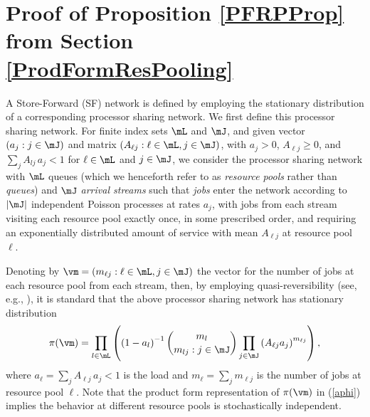 \documentclass{amsart}
\begin{document}
\section{Proof of Proposition \ref{PFRPProp} from Section \ref{ProdFormResPooling}}
A Store-Forward (SF) network is defined by employing the stationary distribution of a corresponding
processor sharing network.
We first define this processor sharing network. For finite index sets $\mL$ and $\mJ$, and given vector 
$(a_j: j\in \mJ)$ and matrix $(A_{\ell j}: \ell \in \mL, j \in \mJ)$, with $a_j >0$, $A_{\ell j} \ge 0$, and $\sum_{j} A_{lj} \, a_j < 1$
for $\ell\in \mL$ and $j\in \mJ$, we consider the processor sharing network with $\mL$ queues (which we henceforth refer to as \emph{resource pools} rather than \emph{queues}) and $\mJ$ \emph{arrival streams} such that \emph{jobs} enter the network according to $|\mJ|$ independent Poisson processes at rates $a_j$, with jobs from each stream visiting
each resource pool exactly once, in some prescribed order, and requiring an
exponentially distributed amount of service with mean $A_{\ell j}$ at resource pool $\ell$.  

Denoting by $\vm = (m_{\ell j}: \ell \in \mL, j \in \mJ)$ the vector for the number of 
jobs at each resource pool from each stream, then, by employing quasi-reversibility (see, e.g., \cite{Ke79}), it is standard that the above processor sharing network has stationary distribution
\begin{equation}
\label{aphi}
\pi(\vm)=
\prod_{l \in \mL}   \left( \left({1-a_l}\right)^{-1} {{m}_l \choose {m}_{lj}: j\in\mJ}\prod_{\substack{j \in\mJ }} \left({A_{\ell j}a_j}\right)^{{m}_{\ell j}}\right),
\end{equation}
where $a_{\ell}=\sum_{j} A_{\ell j} \, a_j < 1$ is the load and $m_{\ell}=\sum_{j} m_{\ell j}$ is the number of jobs at resource pool $\ell$.  Note that the product form
representation of $\pi(\vm)$ in (\ref{aphi}) implies the behavior at different
resource pools is stochastically independent.  
\end{document}
